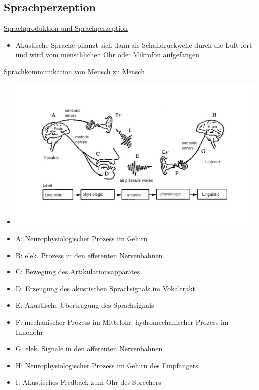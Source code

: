 \documentclass[a4paper,10pt,oneside]{article}
\begin{document}
\subsection{Sprachperzeption}
\underline{Sprachproduktion und Sprachperzeption} \\
	\begin{itemize}
		\item Akustische Sprache pflanzt sich dann als Schalldruckwelle durch die Luft fort und wird vom menschlichen Ohr oder Mikrofon aufgefangen
	\end{itemize}
	
\underline{Sprachkommunikation von Mensch zu Mensch} \\
	\begin{itemize}
		\item[] \includegraphics[scale=0.2]{Grafiken/1246.png}
		\item A: Neurophysiologischer Prozess im Gehirn
		\item B: elek. Prozess in den efferenten Nervenbahnen
		\item C: Bewegung des Artikulationsapparates
		\item D: Erzeugung des akustischen Sprachsignals im Vokaltrakt
		\item E: Akustische Übertragung des Sprachsignals
		\item F: mechanischer Prozess im Mittelohr, hydromechanischer Prozess im Innenohr
		\item G: elek. Signale in den afferenten Nervenbahnen
		\item H: Neurophysiologischer Prozess im Gehirn des Empfängers
		\item I: Akustisches Feedback zum Ohr des Sprechers
	\end{itemize}
	
\end{document}
